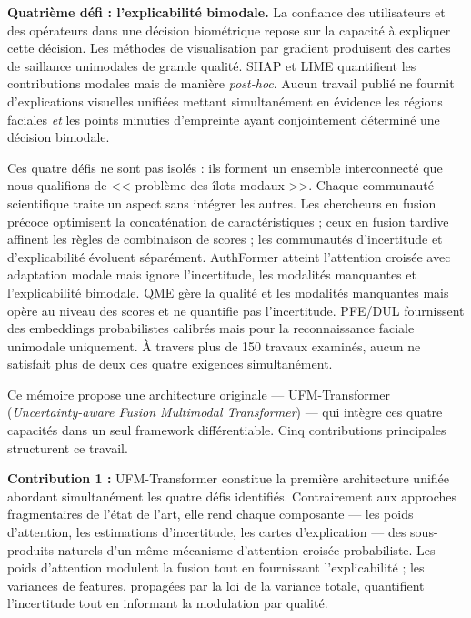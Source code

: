 \documentclass[12pt,a4paper]{report}
\begin{document}
\textbf{Quatri\`{e}me d\'{e}fi : l'explicabilit\'{e} bimodale.} La confiance des utilisateurs et des op\'{e}rateurs dans une d\'{e}cision biom\'{e}trique repose sur la capacit\'{e} \`{a} expliquer cette d\'{e}cision. Les m\'{e}thodes de visualisation par gradient \cite{selvaraju2017grad, lu2024corrRISE} produisent des cartes de saillance unimodales de grande qualit\'{e}. SHAP et LIME \cite{selvarani2025explainability} quantifient les contributions modales mais de mani\`{e}re \emph{post-hoc}. Aucun travail publi\'{e} ne fournit d'explications visuelles unifi\'{e}es mettant simultan\'{e}ment en \'{e}vidence les r\'{e}gions faciales \textit{et} les points minuties d'empreinte ayant conjointement d\'{e}termin\'{e} une d\'{e}cision bimodale.

Ces quatre d\'{e}fis ne sont pas isol\'{e}s : ils forment un ensemble interconnect\'{e} que nous qualifions de << probl\`{e}me des \^{i}lots modaux >>. Chaque communaut\'{e} scientifique traite un aspect sans int\'{e}grer les autres. Les chercheurs en fusion pr\'{e}coce optimisent la concat\'{e}nation de caract\'{e}ristiques \cite{soleymani2018generalized} ; ceux en fusion tardive affinent les r\`{e}gles de combinaison de scores \cite{nandakumar2008likelihood} ; les communaut\'{e}s d'incertitude \cite{shi2019pfe, chang2020data} et d'explicabilit\'{e} \cite{neto2022explainable, lu2024corrRISE} \'{e}voluent s\'{e}par\'{e}ment. AuthFormer \cite{yang2024authformer} atteint l'attention crois\'{e}e avec adaptation modale mais ignore l'incertitude, les modalit\'{e}s manquantes et l'explicabilit\'{e} bimodale. QME \cite{zhu2025qme} g\`{e}re la qualit\'{e} et les modalit\'{e}s manquantes mais op\`{e}re au niveau des scores et ne quantifie pas l'incertitude. PFE/DUL \cite{shi2019pfe, chang2020data} fournissent des embeddings probabilistes calibr\'{e}s mais pour la reconnaissance faciale unimodale uniquement. \`{A} travers plus de 150 travaux examin\'{e}s, aucun ne satisfait plus de deux des quatre exigences simultan\'{e}ment.

Ce m\'{e}moire propose une architecture originale --- UFM-Transformer (\emph{Uncertainty-aware Fusion Multimodal Transformer}) --- qui int\`{e}gre ces quatre capacit\'{e}s dans un seul framework diff\'{e}rentiable. Cinq contributions principales structurent ce travail.

\textbf{Contribution 1 :} UFM-Transformer constitue la premi\`{e}re architecture unifi\'{e}e abordant simultan\'{e}ment les quatre d\'{e}fis identifi\'{e}s. Contrairement aux approches fragmentaires de l'\'{e}tat de l'art, elle rend chaque composante --- les poids d'attention, les estimations d'incertitude, les cartes d'explication --- des sous-produits naturels d'un m\^{e}me m\'{e}canisme d'attention crois\'{e}e probabiliste. Les poids d'attention modulent la fusion tout en fournissant l'explicabilit\'{e} ; les variances de features, propag\'{e}es par la loi de la variance totale, quantifient l'incertitude tout en informant la modulation par qualit\'{e}.
\end{document}
